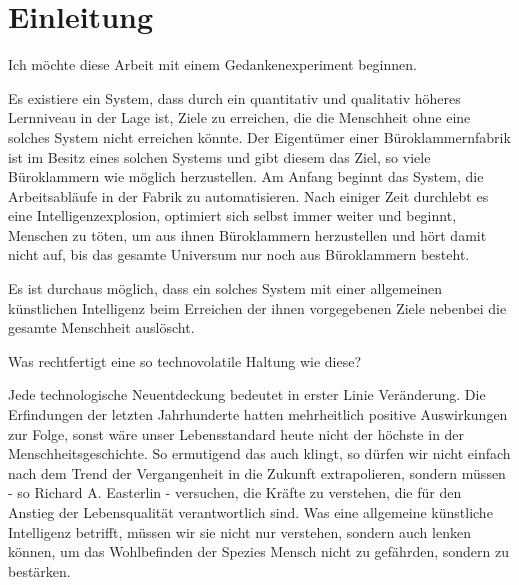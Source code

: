 \chapter{Einleitung}

Ich möchte diese Arbeit mit einem Gedankenexperiment beginnen.

Es existiere ein System, dass durch ein quantitativ und qualitativ höheres Lernniveau in der Lage ist, Ziele zu erreichen, die die Menschheit ohne eine solches System nicht erreichen könnte. Der Eigentümer einer Büroklammernfabrik ist im Besitz eines solchen Systems und gibt diesem das Ziel, so viele Büroklammern wie möglich herzustellen. Am Anfang beginnt das System, die Arbeitsabläufe in der Fabrik zu automatisieren. Nach einiger Zeit durchlebt es eine Intelligenzexplosion, optimiert sich selbst immer weiter und beginnt, Menschen zu töten, um aus ihnen Büroklammern herzustellen und hört damit nicht auf, bis das gesamte Universum nur noch aus Büroklammern besteht. 

Es ist durchaus möglich, dass ein solches System mit einer allgemeinen künstlichen Intelligenz beim Erreichen der ihnen vorgegebenen Ziele nebenbei die gesamte Menschheit auslöscht.

Was rechtfertigt eine so technovolatile Haltung wie diese?


Jede technologische Neuentdeckung bedeutet in erster Linie Veränderung. Die Erfindungen der letzten Jahrhunderte hatten mehrheitlich positive Auswirkungen zur Folge, sonst wäre unser Lebensstandard heute nicht der höchste in der Menschheitsgeschichte. So ermutigend das auch klingt, so dürfen wir nicht einfach nach dem Trend der Vergangenheit in die Zukunft extrapolieren, sondern müssen - so Richard A. Easterlin - versuchen, die Kräfte zu verstehen, die für den Anstieg der Lebensqualität verantwortlich sind.  Was eine allgemeine künstliche Intelligenz betrifft, müssen wir sie nicht nur verstehen, sondern auch lenken können, um das Wohlbefinden der Spezies Mensch nicht zu gefährden, sondern zu bestärken.


